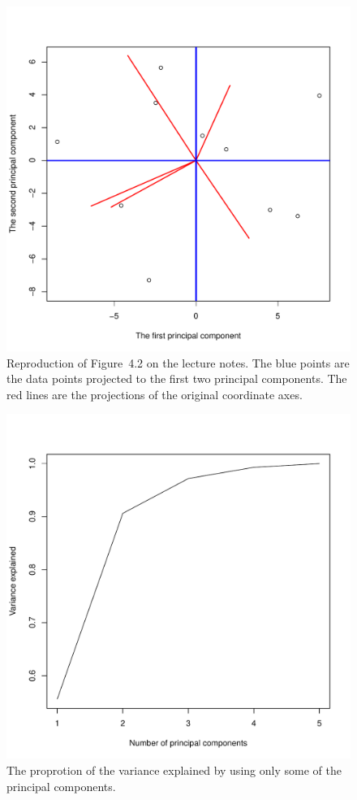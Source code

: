 \documentclass{article}
\begin{document}
\begin{figure}\centering
	\includegraphics[scale=\sscale]{fig42}
	\caption{Reproduction of Figure~4.2 on the lecture notes. The blue points are the data points projected to the first two principal components. The red lines are the projections of the original coordinate axes.}\label{fig:42}
\end{figure}
\begin{figure}\centering
	\includegraphics[scale=\sscale]{varamount}
	\caption{The proprotion of the variance explained by using only some of the principal components.}\label{fig:varamount}
\end{figure}
\end{document}

